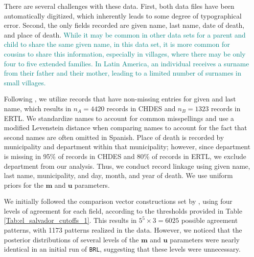 \documentclass[ba]{imsart}
\begin{document}
	There are several challenges with these data. First, both data files have been automatically digitized, which inherently leads to some degree of typographical error. Second, the only fields recorded are given name, last name, date of death, and place of death. \textcolor{teal}{While it may be common in other data sets for a parent and child to share the same given name, in this data set, it is more common for cousins to share this information, especially in villages, where there may be only four to five extended families. In Latin America, an individual receives a surname from their father and their mother, leading to a limited number of surnames in small villages.}
	
	Following \cite{sadinle_bayesian_2017}, we utilize records that have non-missing entries for given and last name, which results in $n_A = 4420$ records in CHDES and $n_B = 1323$ records in ERTL. We standardize names to account for common misspellings and use a modified Levenstein distance when comparing names to account for the fact that second names are often omitted in Spanish. Place of death is recorded by municipality and department within that municipality; however, since department is missing in 95\% of records in CHDES and 80\% of records in ERTL, we exclude department from our analysis. Thus, we conduct record linkage using given name, last name, municipality, and day, month, and year of death. We use uniform priors for the $\bm{m}$ and $\bm{u}$ parameters.
	
	We initially followed the comparison vector constructions set by \cite{sadinle_bayesian_2017}, using four levels of agreement for each field, according to the thresholds provided in Table \ref{Tab:el_salvador_cutoffs_1}. This results in $5^5 \times 3 = 6025$ possible agreement patterns, with 1173 patterns realized in the data. However, we noticed that the posterior distributions of several levels of the $\bm{m}$ and $\bm{u}$ parameters were nearly identical in an initial run of \texttt{BRL}, suggesting that these levels were unnecessary.
	
\end{document}
